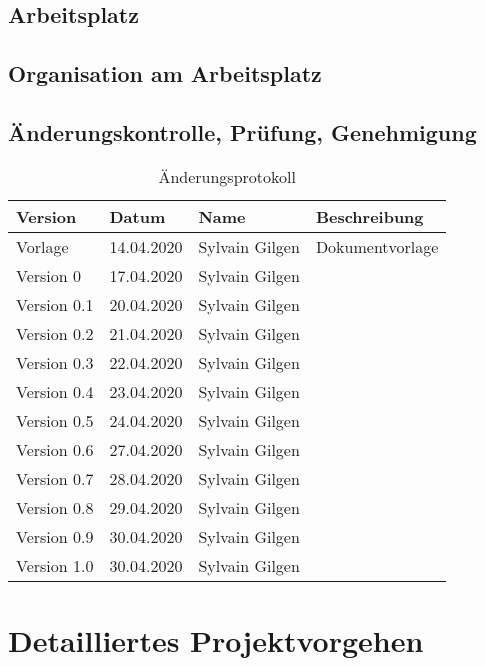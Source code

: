 \pagebreak
\section{Arbeitsplatz}

\section{Organisation am Arbeitsplatz}

\section{Änderungskontrolle, Prüfung, Genehmigung}
\begin{table}[h!]
    \begin{tabular}{|L{0.15\textwidth}|L{0.15\textwidth}|L{0.18\textwidth}|L{0.41\textwidth}|}
        \hline
        Version & Datum & Name & Beschreibung \\[11pt]
        \hline
        Vorlage & 14.04.2020 & Sylvain Gilgen & Dokumentvorlage\\
        \hline
        Version 0 & 17.04.2020 & Sylvain Gilgen & \\
        \hline
        Version 0.1 & 20.04.2020 & Sylvain Gilgen & \\
        \hline
        Version 0.2 & 21.04.2020 & Sylvain Gilgen & \\
        \hline
        Version 0.3 & 22.04.2020 & Sylvain Gilgen & \\
        \hline
        Version 0.4 & 23.04.2020 & Sylvain Gilgen & \\
        \hline
        Version 0.5 & 24.04.2020 & Sylvain Gilgen & \\
        \hline
        Version 0.6 & 27.04.2020 & Sylvain Gilgen & \\
        \hline
        Version 0.7 & 28.04.2020 & Sylvain Gilgen & \\
        \hline
        Version 0.8 & 29.04.2020 & Sylvain Gilgen & \\
        \hline
        Version 0.9 & 30.04.2020 & Sylvain Gilgen & \\
        \hline
        Version 1.0 & 30.04.2020 & Sylvain Gilgen & \\
        \hline
    \end{tabular}
    \caption{Änderungsprotokoll}
\end{table}
\chapter{Detailliertes Projektvorgehen}

